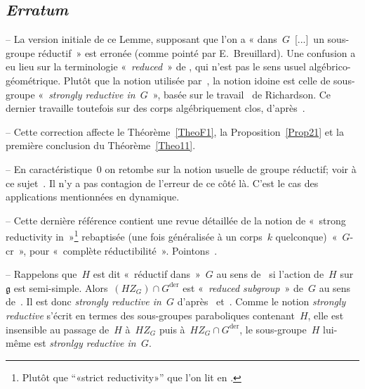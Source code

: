 \documentclass[french]{amsart}
\newcommand{\lie}[1]{{\mathfrak{#1}}}
\begin{document}
\subsection*{\emph{Erratum}}\label{Erratum} -- La version initiale de ce Lemme, supposant que l'on a « dans~$G$~[...]~un sous-groupe réductif~» est erronée (comme pointé par E.~Breuillard). Une confusion a eu lieu sur la terminologie «~\emph{reduced}~» de \cite[p. 101]{PR94}, qui n'est pas le sens usuel algébrico-géométrique. Plutôt que la notion utilisée par~\cite[p.~101]{PR94}, la notion idoine est celle de sous-groupe «~\emph{strongly reductive in~$G$}~», basée sur le travail~\cite[\S16]{Richardson} de Richardson. Ce dernier travaille toutefois sur des corps algébriquement clos, d'a\-près~\cite[\S1.1]{Richardson}. 

-- Cette correction affecte le Théorème~\ref{TheoF1}, la Proposition~\ref{Prop21} et la première conclusion du Théorème~\ref{Theo11}.

-- En caractéristique~$0$ on retombe sur la notion usuelle de groupe réductif; voir à ce sujet~\cite[Proposition~4.2]{SerreCR}. Il n'y a pas contagion de l'erreur de ce côté là. C'est le cas des applications mentionnées en dynamique.

-- Cette dernière référence contient une revue détaillée de la notion de «~strong reductivity in~»\footnote{Plutôt que ``«strict reductivity»'' que l'on lit en \cite[page~932-13]{SerreCR}.} rebaptisée (une fois généralisée à un corps~$k$ quelconque)~«~$G$-cr~», pour «~complète réductibilité~». Pointons~\cite[\S3.1.1, Th~3.5, Th.~3.7, \S~4.1]{SerreCR}.

-- Rappelons que~$H$ est dit «~réductif dans~»~$G$ au sens de~\cite{RichardShah} si l'action de~$H$ sur~$\lie{g}$ est semi-simple. Alors~$(HZ_G)\cap G^\text{der}$ est «~\emph{reduced subgroup}~» de~$G$ au sens de~\cite{PR94}. Il est donc \emph{strongly reductive in~$G$} d'après~\cite[Th.~2.16]{PR94} et~\cite[Th.16.4]{Richardson}. Comme le notion \emph{strongly reductive} s'écrit en termes des sous-groupes paraboliques contenant~$H$, elle est insensible au passage de~$H$ à~$HZ_G$ puis à~$HZ_G\cap G^\text{der}$, le sous-groupe~$H$ lui-même est \emph{stronlgy reductive in~$G$}.
\end{document}
